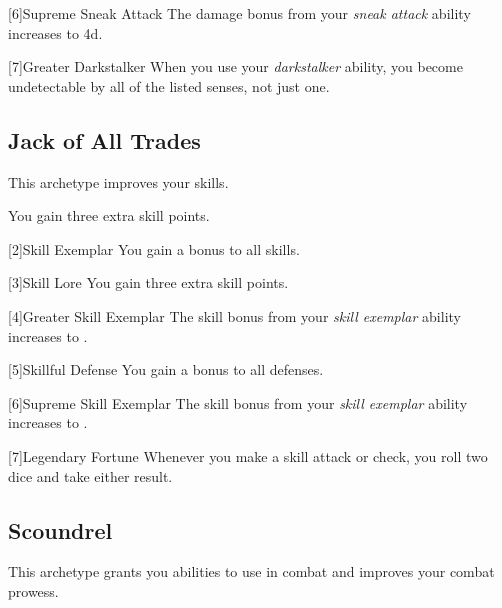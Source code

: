         [6]{Supreme Sneak Attack} The damage bonus from your \textit{sneak attack} ability increases to \plus4d.

        [7]{Greater Darkstalker} When you use your \textit{darkstalker} ability, you become undetectable by all of the listed senses, not just one.

    \subsection{Jack of All Trades}
        This archetype improves your skills.

         You gain three extra skill points.

        [2]{Skill Exemplar} You gain a  bonus to all skills.

        [3]{Skill Lore} You gain three extra skill points.

        [4]{Greater Skill Exemplar} The skill bonus from your \textit{skill exemplar} ability increases to .

        [5]{Skillful Defense} You gain a  bonus to all defenses.

        [6]{Supreme Skill Exemplar} The skill bonus from your \textit{skill exemplar} ability increases to .

        [7]{Legendary Fortune} Whenever you make a skill attack or check, you roll two dice and take either result.

    \subsection{Scoundrel}
        This archetype grants you abilities to use in combat and improves your combat prowess.


